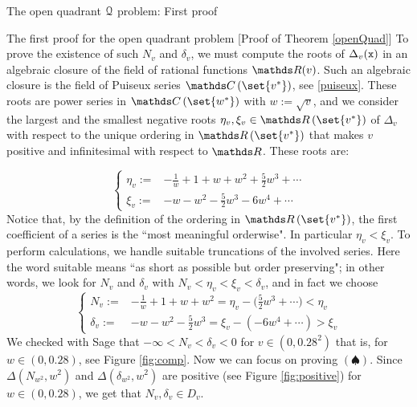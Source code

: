 \documentclass[11pt, a4paper, english, twoside, notitlepage, openright]{report}
\begin{document}
\begin{chapter}{The open quadrant $\mathcal{Q}$ problem: First proof}
\begin{section}{The first proof for the open quadrant problem} [Proof of Theorem \ref{openQuad}]
To prove the existence of such $N_v$ and $\delta_v$, we must compute the roots of $\Delta_v({\tt x})$ in an algebraic closure of the field of rational functions $\R(v)$. Such an algebraic closure is the field of Puiseux series $\C\left(\set{v^*}\right)$, see \ref{puiseux}. These roots are power series in $\C\left(\set{w^*}\right)$ with $w:=\sqrt{v}$, and we consider the largest and the smallest negative roots $\eta_v,\xi_v\in\R\left(\set{v^*}\right)$ of $\Delta_v$ with respect to the unique ordering in $\R\left(\set{v^*}\right)$ that makes $v$ positive and infinitesimal with respect to $\R$. These roots are:
			
\begin{equation*}\left\{\begin{split}
\eta_v:=&-\frac{1}{w}+1+w+w^2+\frac{5}{2}w^3+\cdots\\
\xi_v:=&-w-w^2-\frac{5}{2}w^3-6w^4+\cdots
\end{split}\right.
\end{equation*}
Notice that, by the definition of the ordering in $\R\left(\set{v^*}\right)$, the first coefficient of a series is the ``most meaningful orderwise". In particular $\eta_v<\xi_v$. To perform calculations, we handle suitable truncations of the involved series. Here the word suitable means ``as short as possible but order preserving"; in other words, we look for $N_v$ and $\delta_v$ with $N_v<\eta_v<\xi_v<\delta_v$, and in fact we choose
\begin{equation*}\left\{
\begin{split}
N_v:=&-\frac{1}{w}+1+w+w^2=\eta_v-\Big(\frac{5}{2}w^3+\cdots\Big)<\eta_v\\
\delta_v:=&-w-w^2-\frac{5}{2}w^3=\xi_v-(-6w^4+\cdots)>\xi_v
\end{split}\right.
\end{equation*}
We checked with Sage that $-\infty<N_v<\delta_v<0$ for $v\in (0,0.28^2)$ that is, for $w\in(0,0.28)$, see Figure \ref{fig:comp}. Now we can focus on proving $(\spadesuit)$. Since $\Delta(N_{w^2},w^2)$ and $\Delta(\delta_{w^2},w^2)$ are positive (see Figure \ref{fig:positive}) for $w\in (0,0.28)$, we get that $N_v, \delta_v\in D_v$.
\begin{figure}[h]\hspace{-0.25cm}
\begin{subfigure}{.50\linewidth}\centering

\end{subfigure}
\end{figure}
\end{section}
\end{chapter}
\end{document}
